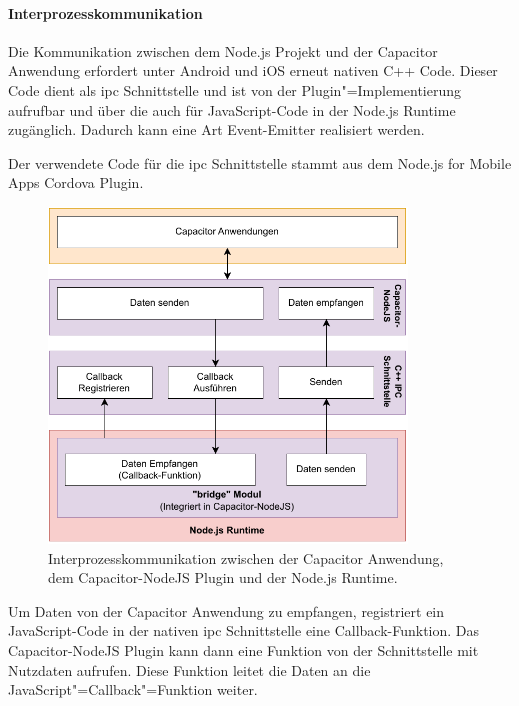 \newpage

\paragraph{Interprozesskommunikation}

Die Kommunikation zwischen dem Node.js Projekt und der Capacitor Anwendung erfordert unter Android und iOS erneut nativen C++ Code.
Dieser Code dient als \ac{ipc} Schnittstelle und ist von der Plugin"=Implementierung aufrufbar und über die  auch für JavaScript-Code in der Node.js Runtime zugänglich.
Dadurch kann eine Art Event-Emitter realisiert werden.

Der verwendete Code für die \ac{ipc} Schnittstelle stammt aus dem Node.js for Mobile Apps Cordova Plugin.
\cite{nodejs-mobile-cordova}

\vspace{1em}

\begin{figure}[H]
    \centering
    \includegraphics[width=0.85\textwidth]{assets/02_Capacitor-NodeJS/03_Interprozesskommunikation.drawio.pdf}
    \caption[Capacitor-NodeJS / Interprozesskommunikation]{Interprozesskommunikation zwischen der Capacitor Anwendung, dem Capacitor-NodeJS Plugin und der Node.js Runtime.}
\end{figure}

Um Daten von der Capacitor Anwendung zu empfangen, registriert ein JavaScript-Code in der nativen \ac{ipc} Schnittstelle eine Callback-Funktion.
Das Capacitor-NodeJS Plugin kann dann eine Funktion von der Schnittstelle mit Nutzdaten aufrufen.
Diese Funktion leitet die Daten an die JavaScript"=Callback"=Funktion weiter.

